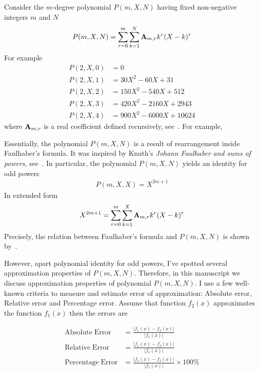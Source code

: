 Consider the $m$-degree polynomial $P(m, X, N)$ having fixed non-negative integers $m$ and $N$
\begin{align*}
    P(m,X,N) = \sum_{r=0}^{m} \sum_{k=1}^{N} {\mathbf{A}} \sb{m,r} k^r (X-k)^r
\end{align*}
For example
\begin{align*}
    P(2,X,0) &= 0 \\
    P(2,X,1) &= 30X^2 - 60X + 31 \\
    P(2,X,2) &= 150X^2 - 540X + 512 \\
    P(2,X,3) &= 420X^2 - 2160X + 2943 \\
    P(2,X,4) &= 900X^2 - 6000X + 10624
\end{align*}
where ${\mathbf{A}} \sb{m,r}$ is a real coefficient defined recursively, see~\cite{alekseyev2018mathoverflow,
    on_the_link_between_binomial_theorem_and_discrete_convolution, unusual_identity_for_odd_powers,
    history_and_overview_of_polynomial_p}.
For example,


Essentially, the polynomial $P(m, X, N)$ is a result of rearrangement inside Faulhaber's formula.
It was inspired by Knuth's \textit{Johann Faulhaber and sums of powers}, see~\cite{knuth1993johann}.
In particular, the polynomial $P(m, X, N)$ yields an identity for odd powers
\begin{align*}
    P(m, X, X) = X^{2m+1}
\end{align*}
In extended form
\begin{align*}
    X^{2m+1} = \sum_{r=0}^{m} \sum_{k=1}^{X} {\mathbf{A}} \sb{m,r} k^r (X-k)^r
\end{align*}
Precisely, the relation between Faulhaber's formula and $P(m,X,N)$ is shown by~\cite{kolosov2025unexpected}.

However, apart polynomial identity for odd powers, I've spotted several approximation properties of $P(m,X,N)$.
Therefore, in this manuscript we discuss approximation properties of polynomial $P(m,X,N)$.
I use a few well-known criteria to measure and estimate error of approximation: Absolute error, Relative error and
Percentage error.
Assume that function $f_2(x)$ approximates the function $f_1 (x)$ then the errors are

\begin{align*}
    \mathrm{Absolute \; Error}   &= \frac{\lvert f_1(x) - f_2(x) \rvert}{\lvert f_1(x) \rvert} \\
    \mathrm{Relative \; Error}   &= \frac{\lvert f_1(x) - f_2(x) \rvert}{\lvert f_1(x) \rvert} \\
    \mathrm{Percentage \; Error} &= \frac{\lvert f_1(x) - f_2(x) \rvert}{\lvert f_1(x) \rvert} \times 100\%
\end{align*}

